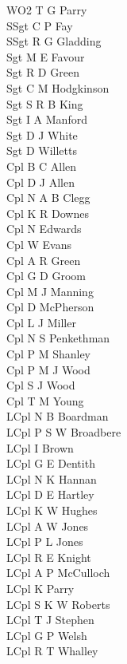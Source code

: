 \begin{multicols}{2}
  \small
  \noindent
  WO2 T G Parry \\
  SSgt C P Fay \\
  SSgt R G Gladding \\
  Sgt M E Favour \\
  Sgt R D Green \\
  Sgt C M Hodgkinson \\
  Sgt S R B King \\
  Sgt I A Manford \\
  Sgt D J White \\
  Sgt D Willetts \\
  Cpl B C Allen \\
  Cpl D J Allen \\
  Cpl N A B Clegg \\
  Cpl K R Downes \\
  Cpl N Edwards \\
  Cpl W Evans \\
  Cpl A R Green \\
  Cpl G D Groom \\
  Cpl M J Manning \\
  Cpl D McPherson \\
  Cpl L J Miller \\
  Cpl N S Penkethman \\
  Cpl P M Shanley \\
  Cpl P M J Wood \\
  Cpl S J Wood \\
  Cpl T M Young \\
  LCpl N B Boardman \\
  LCpl P S W Broadbere \\
  LCpl I Brown \\
  LCpl G E Dentith \\
  LCpl N K Hannan \\
  LCpl D E Hartley \\
  LCpl K W Hughes \\
  LCpl A W Jones \\
  LCpl P L Jones \\
  LCpl R E Knight \\
  LCpl A P McCulloch \\
  LCpl K Parry \\
  LCpl S K W Roberts \\
  LCpl T J Stephen \\
  LCpl G P Welsh \\
  LCpl R T Whalley \\

\end{multicols}
